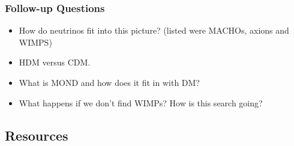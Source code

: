 \documentclass[a4paper,11pt]{article}
\begin{document}
\subsubsection{Follow-up Questions}

\begin{itemize}
    \item How do neutrinos fit into this picture? (listed were MACHOs, axions and WIMPS)
    \item HDM versus CDM.
    \item What is MOND and how does it fit in with DM?
    \item What happens if we don't find WIMPs? How is this search going?
\end{itemize}


\newpage
\subsection{Resources}
\end{document}
